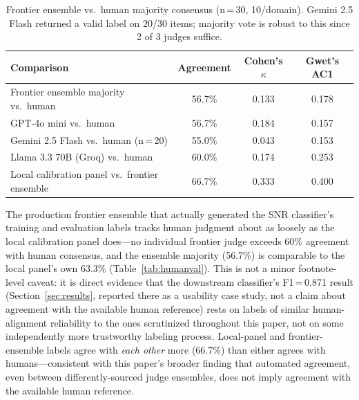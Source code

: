 \documentclass[11pt]{article}
\begin{document}
\begin{table}[ht]
\centering
\caption{Frontier ensemble vs.\ human majority consensus (n\,=\,30, 10/domain).
Gemini 2.5 Flash returned a valid label on 20/30 items; majority vote is
robust to this since 2 of 3 judges suffice.}
\label{tab:frontierhuman}
\small
\begin{tabular}{lccc}
\toprule
\textbf{Comparison} & \textbf{Agreement} & \textbf{Cohen's $\kappa$} & \textbf{Gwet's AC1} \\
\midrule
Frontier ensemble majority vs.\ human & 56.7\% & 0.133 & 0.178 \\
\quad GPT-4o mini vs.\ human & 56.7\% & 0.184 & 0.157 \\
\quad Gemini 2.5 Flash vs.\ human (n\,=\,20) & 55.0\% & 0.043 & 0.153 \\
\quad Llama 3.3 70B (Groq) vs.\ human & 60.0\% & 0.174 & 0.253 \\
Local calibration panel vs.\ frontier ensemble & 66.7\% & 0.333 & 0.400 \\
\bottomrule
\end{tabular}
\end{table}

The production frontier ensemble that actually generated the SNR
classifier's training and evaluation labels tracks human judgment about as
loosely as the local calibration panel does---no individual frontier judge
exceeds 60\% agreement with human consensus, and the ensemble majority
(56.7\%) is comparable to the local panel's own 63.3\% (Table~\ref{tab:humanval}).
This is not a minor footnote-level caveat: it is direct evidence that the
downstream classifier's F1\,=\,0.871 result (Section~\ref{sec:results}, reported
there as a usability case study, not a claim about agreement with the
available human reference) rests on labels of similar human-alignment
reliability to the ones scrutinized throughout this paper, not on some
independently more trustworthy labeling process. Local-panel and
frontier-ensemble labels agree with \emph{each other} more (66.7\%) than
either agrees with humans---consistent with this paper's broader finding
that automated agreement, even between differently-sourced judge
ensembles, does not imply agreement with the available human reference.
\end{document}
